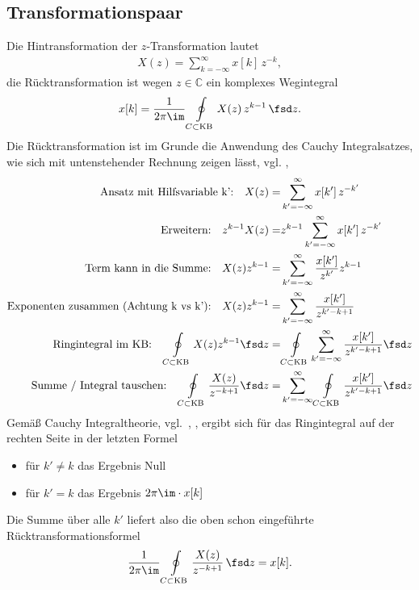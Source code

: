 \subsection*{Transformationspaar}
Die Hintransformation der $z$-Transformation lautet
\begin{align}
X(z) = \sum_{k=-\infty}^{\infty} x[k] \, z^{-k},
\end{align}
die Rücktransformation ist wegen $z\in\mathbb{C}$ ein komplexes Wegintegral
\begin{align}
x[k] = \frac{1}{2\pi \im} \oint\limits_{C \subset \text{KB}} X(z) \, z^{k-1} \, \fsd z.
\end{align}
%
Die Rücktransformation ist im Grunde die Anwendung des Cauchy
Integralsatzes, wie sich mit untenstehender Rechnung zeigen lässt, vgl.
\cite[S.\,152]{Wunsch1972}, \cite[S.\,180ff]{Wunsch2006a}
\begin{align}
\text{Ansatz mit Hilfsvariable k':} \quad X(z) =& \sum_{k'=-\infty}^{\infty} x[k'] \, z^{-k'}\\
\text{Erweitern:} \quad z^{k-1} X(z) =& z^{k-1} \sum_{k'=-\infty}^{\infty} x[k'] \, z^{-k'}\\
\text{Term kann in die Summe:} \quad X(z) z^{k-1} =& \sum_{k'=-\infty}^{\infty} \frac{x[k']}{z^{k'}} z^{k-1}\\
\text{Exponenten zusammen (Achtung k vs k'):} \quad X(z) z^{k-1} =& \sum_{k'=-\infty}^{\infty} \frac{x[k']}{z^{k'-k+1}}\\
\text{Ringintegral im KB:} \quad \oint\limits_{C \subset \text{KB}} X(z) z^{k-1} \fsd z =&
\oint\limits_{C \subset \text{KB}}
\sum_{k'=-\infty}^{\infty} \frac{x[k']}{z^{k'-k+1}} \fsd z\\
\text{Summe / Integral tauschen:} \quad
\oint\limits_{C \subset \text{KB}} \frac{X(z)}{z^{-k+1}} \fsd z =&
\sum_{k'=-\infty}^{\infty}
\oint\limits_{C \subset \text{KB}}
\frac{x[k']}{z^{k'-k+1}} \fsd z
\end{align}
Gemäß Cauchy Integraltheorie, vgl.~\cite[Kap.\,5]{Strang2007,Strang2010}, \cite[Kap.\,2]{Burg2013b},
ergibt sich für das Ringintegral auf der rechten Seite in der letzten Formel
\begin{itemize}
  \item für $k' \neq k$ das Ergebnis Null
  \item für $k' = k$ das Ergebnis $2\pi \im \cdot x[k]$
\end{itemize}
Die Summe über alle $k'$ liefert also die oben schon eingeführte Rücktransformationsformel
\begin{align}
\frac{1}{2\pi \im} \oint\limits_{C \subset \text{KB}} \frac{X(z)}{z^{-k+1}} \, \fsd z
= x[k].
\end{align}
